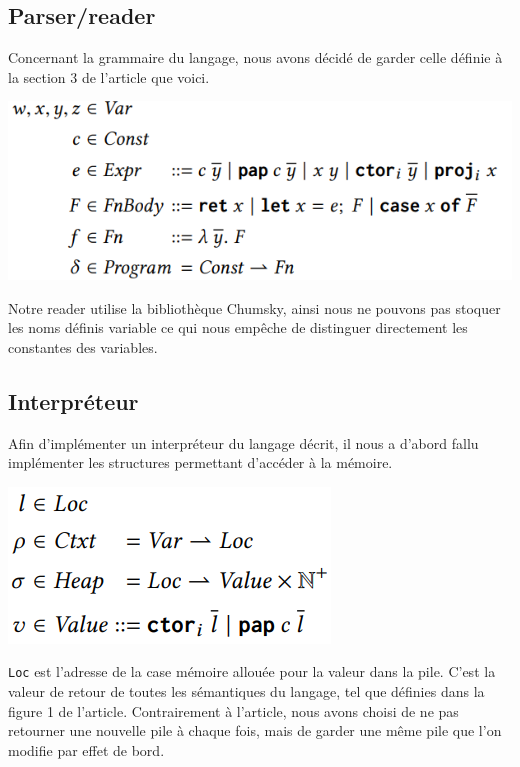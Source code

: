 \documentclass{rapportECL}
\begin{document}
\subsection{Parser/reader}
Concernant la grammaire du langage, nous avons décidé de garder celle définie à la section 3 de l'article que voici.
\begin{center}
	\includegraphics[scale=0.65]{logos/grammaire.png}	
\end{center}
Notre reader utilise la bibliothèque Chumsky\cite{zesterer_chumsky_nodate}, ainsi nous ne pouvons pas stoquer les noms définis 
variable ce qui nous empêche de distinguer directement les constantes des variables.

\subsection{Interpréteur}

Afin d'implémenter un interpréteur du langage décrit, il nous a d'abord fallu implémenter les structures permettant d'accéder à la mémoire.

\begin{center}
	\includegraphics[scale=0.65]{logos/figure_strutures_interpreteur.png}	
\end{center}

\verb|Loc| est l'adresse de la case mémoire allouée pour la valeur dans la pile. C'est la valeur de retour de toutes les sémantiques 
du langage, tel que définies dans la figure 1 de l'article\cite{ullrich_counting_2020}.
Contrairement à l'article, nous avons choisi de ne pas retourner une nouvelle pile à chaque fois, mais de garder une même pile que 
l'on modifie par effet de bord. 
\end{document}

